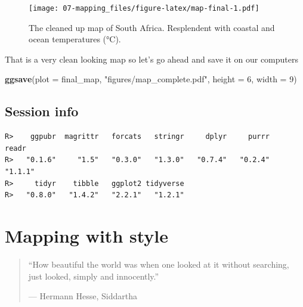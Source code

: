 \documentclass[]{book}
\newenvironment{Shaded}{\begin{snugshade}}{\end{snugshade}}
\newcommand{\KeywordTok}[1]{\textcolor[rgb]{0.13,0.29,0.53}{\textbf{#1}}}
\newcommand{\DataTypeTok}[1]{\textcolor[rgb]{0.13,0.29,0.53}{#1}}
\newcommand{\DecValTok}[1]{\textcolor[rgb]{0.00,0.00,0.81}{#1}}
\newcommand{\StringTok}[1]{\textcolor[rgb]{0.31,0.60,0.02}{#1}}
\newcommand{\OperatorTok}[1]{\textcolor[rgb]{0.81,0.36,0.00}{\textbf{#1}}}
\newcommand{\NormalTok}[1]{#1}
\theoremstyle{definition}
\theoremstyle{definition}
\theoremstyle{definition}
\theoremstyle{remark}
\begin{document}
\begin{figure}
\centering
\texttt{[image: 07-mapping\_files/figure-latex/map-final-1.pdf]}
\caption{\label{fig:map-final}The cleaned up map of South Africa.
Resplendent with coastal and ocean temperatures (°C).}
\end{figure}

That is a very clean looking map so let's go ahead and save it on our
computers

\begin{Shaded}
\begin{Highlighting}[]
\KeywordTok{ggsave}\NormalTok{(}\DataTypeTok{plot =}\NormalTok{ final_map, }\StringTok{"figures/map_complete.pdf"}\NormalTok{, }\DataTypeTok{height =} \DecValTok{6}\NormalTok{, }\DataTypeTok{width =} \DecValTok{9}\NormalTok{)}
\end{Highlighting}
\end{Shaded}

\section{Session info}\label{session-info-6}

\begin{Shaded}
\end{Shaded}

\begin{verbatim}
R>    ggpubr  magrittr   forcats   stringr     dplyr     purrr     readr 
R>   "0.1.6"     "1.5"   "0.3.0"   "1.3.0"   "0.7.4"   "0.2.4"   "1.1.1" 
R>     tidyr    tibble   ggplot2 tidyverse 
R>   "0.8.0"   "1.4.2"   "2.2.1"   "1.2.1"
\end{verbatim}

\chapter{Mapping with style}\label{mapping_style}

\begin{quote}
``How beautiful the world was when one looked at it without searching,
just looked, simply and innocently.''

--- Hermann Hesse, Siddartha
\end{quote}
\end{document}
